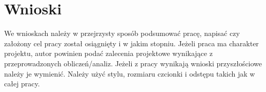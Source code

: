\chapter{Wnioski}

We wnioskach należy w przejrzysty sposób podsumować pracę, napisać czy założony cel pracy został osiągnięty i w jakim stopniu. Jeżeli praca ma charakter projektu, autor powinien podać zalecenia projektowe wynikające z przeprowadzonych obliczeń/analiz. Jeżeli z pracy wynikają wnioski przyszłościowe należy je wymienić. Należy użyć stylu, rozmiaru czcionki i odstępu takich jak w całej pracy.
